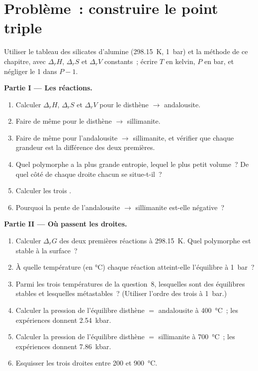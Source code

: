 \section{Problème~: construire le point triple}

\begin{problem}
\label{pb:b2:metamorphic-facies:1}
Utiliser le tableau des silicates d'alumine (\qty{298.15}{K}, \qty{1}{bar}) et la méthode de
ce chapitre, avec $\Delta_r H$, $\Delta_r S$ et $\Delta_r V$ constants~; écrire $T$ en
kelvin, $P$ en bar, et négliger le 1 dans $P - 1$.

\noindent\textbf{Partie I --- Les réactions.}
\begin{enumerate}
\item Calculer $\Delta_r H$, $\Delta_r S$ et $\Delta_r V$ pour le disthène $\to$ andalousite.
\item Faire de même pour le disthène $\to$ sillimanite.
\item Faire de même pour l'andalousite $\to$ sillimanite, et vérifier que chaque grandeur est la
différence des deux premières.
\item Quel polymorphe a la plus grande entropie, lequel le plus petit volume~? De quel côté
de chaque droite chacun se situe-t-il~?
\item Calculer les trois .
\item Pourquoi la pente de l'andalousite $\to$ sillimanite est-elle négative~?
\end{enumerate}

\noindent\textbf{Partie II --- Où passent les droites.}
\begin{enumerate}[resume]
\item Calculer $\Delta_r G$ des deux premières réactions à \qty{298.15}{K}. Quel
polymorphe est stable à la surface~?
\item À quelle température (en \unit{\celsius}) chaque réaction atteint-elle l'équilibre à
\qty{1}{bar}~?
\item Parmi les trois températures de la question~8, lesquelles sont des équilibres stables et lesquelles
métastables~? (Utiliser l'ordre des trois à \qty{1}{bar}.)
\item Calculer la pression de l'équilibre disthène $=$ andalousite à \qty{400}{\celsius}~; les
expériences donnent \qty{2.54}{kbar}.
\item Calculer la pression de l'équilibre disthène $=$ sillimanite à \qty{700}{\celsius}~; les
expériences donnent \qty{7.86}{kbar}.
\item Esquisser les trois droites entre 200 et \qty{900}{\celsius}.
\end{enumerate}


\end{problem}
